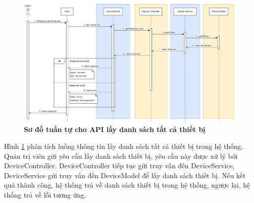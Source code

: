 \begin{figure}[H]
  \centering
  \includegraphics[scale=0.4]{Images/sequence_api/getAllDevices.png}
  \caption[Sơ đồ tuần tự cho API lấy danh sách tất cả thiết bị ]{\bfseries \fontsize{12pt}{0pt}
  \selectfont Sơ đồ tuần tự cho API lấy danh sách tất cả thiết bị }
  \label{api_getAllDevices} %
\end{figure}
Hình \ref{api_getAllDevices} phân tích luồng thông tin lấy danh sách tất cả thiết bị trong hệ thống. Quản trị viên gửi yêu cầu lấy danh sách thiết bị, 
yêu cầu này được xử lý bởi DeviceController. DeviceController tiếp tục gửi truy vấn đến DeviceService, DeviceService gửi truy vấn đến DeviceModel 
để lấy danh sách thiết bị. Nếu kết quả thành công, hệ thống trả về danh sách thiết bị trong hệ thống, ngược lại, hệ thống trả về lỗi tương ứng.

